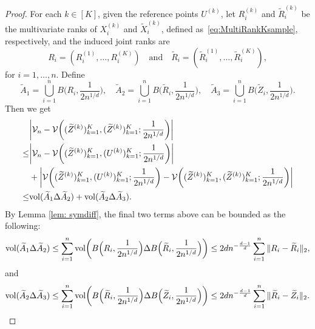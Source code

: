 \documentclass[11pt]{article}
\begin{document}
\begin{proof}
For each $k \in [K]$, given the reference points $U^{(k)}$, let $R_i^{(k)}$ and $\widetilde{R}_i^{(k)}$ be the multivariate ranks of $X_i^{(k)}$ and $\widetilde{X}_i^{(k)}$, defined as~\eqref{eq:MultiRankKsample}, respectively, and the induced joint ranks are
\[
R_i = (R_i^{(1)}, \ldots, R_i^{(K)}) \quad \text{and} \quad \widetilde{R}_i = (\widetilde{R}_i^{(1)}, \ldots, \widetilde{R}_i^{(K)}),
\]
for $i = 1, \ldots, n$. Define
\[
\widetilde{A}_1 = \bigcup_{i=1}^n B\biggl(R_i, \frac{1}{2n^{1/d}}\biggr), \quad \widetilde{A}_2 = \bigcup_{i=1}^n B\biggl(\widetilde{R}_i, \frac{1}{2n^{1/d}}\biggr) , \quad \widetilde{A}_3 = \bigcup_{i=1}^n B\biggl(\widetilde{Z}_i, \frac{1}{2n^{1/d}}\biggr). 
\]
Then we get
\begin{align}
  &\biggl|\mathcal{V}_{n} - \mathcal{V}\biggl((\widetilde{Z}^{(k)})_{k = 1}^K, (\widetilde{Z}^{(k)})_{k = 1}^K; \frac{1}{2n^{1/d}} \biggr)\biggr| \notag \\ 
  \leq & \biggl|\mathcal{V}_{n} - \mathcal{V} \biggl((\widetilde{Z}^{(k)})_{k = 1}^K, ({U}^{(k)})_{k = 1}^K; \frac{1}{2n^{1/d}}\biggr)\biggr| \notag \\ 
  &+\biggl|\mathcal{V} \biggl((\widetilde{Z}^{(k)})_{k = 1}^K, ({U}^{(k)})_{k = 1}^K; \frac{1}{2n^{1/d}}\biggr) - \mathcal{V} \biggl((\widetilde{Z}^{(k)})_{k = 1}^K, (\widetilde{Z}^{(k)})_{k = 1}^K; \frac{1}{2n^{1/d}} \biggr)\biggr| \notag \\ 
  \leq & \mathrm{vol}(\widetilde{A}_1 \Delta \widetilde{A}_2) + \mathrm{vol}(\widetilde{A}_2 \Delta \widetilde{A}_3). \label{ineq:SelfReferenceControl}
\end{align}
By Lemma \ref{lem: symdiff}, the final two terms above can be bounded as the following:
\begin{align}
\mathrm{vol}(\widetilde{A}_1 \Delta \widetilde{A}_2) \leq \sum_{i = 1}^n \mathrm{vol}\biggl(B\Bigl(R_i, \frac{1}{2n^{1/d}}\Bigr) \Delta B\Bigl(\widetilde{R}_i, \frac{1}{2n^{1/d}}\Bigr)\biggr) 
\leq2 d n^{-\frac{d-1}{d}} \sum_{i = 1}^n  \|R_i - \widetilde{R}_i\|_2,   \label{ineq:volA1A2}
\end{align}
and
\begin{align}
  \mathrm{vol}(\widetilde{A}_2\Delta \widetilde{A}_3) \leq \sum_{i = 1}^n \mathrm{vol}\biggl(B\Bigl(\widetilde{R}_i, \frac{1}{2n^{1/d}}\Bigr) \Delta B\Bigl(\widetilde{Z}_i, \frac{1}{2n^{1/d}}\Bigr)\biggr) 
\leq2 d n^{-\frac{d-1}{d}} \sum_{i = 1}^n  \| \widetilde{R}_i - \widetilde{Z}_i\|_2. \label{ineq:volA2A3}
\end{align}


\end{proof}
\end{document}
